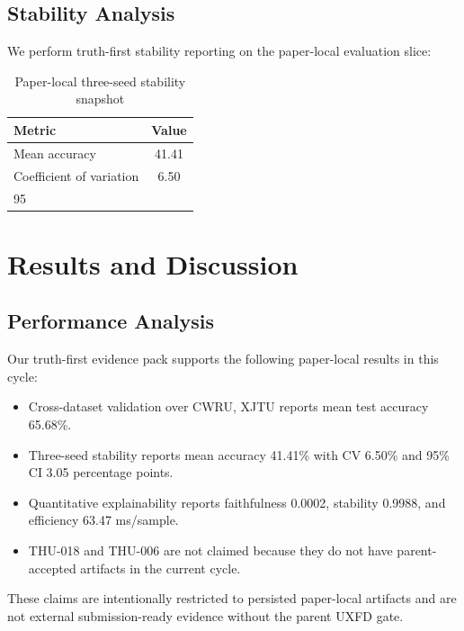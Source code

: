 \documentclass[journal]{IEEEtran}
\begin{document}
\subsection{Stability Analysis}

We perform truth-first stability reporting on the paper-local evaluation slice:

\begin{table}[t]
\centering
\caption{Paper-local three-seed stability snapshot}
\label{tab:stability}
\begin{tabular}{lc}
\toprule
Metric & Value \\
\midrule
Mean accuracy & 41.41\\%
Coefficient of variation & 6.50\\%
95\\%
\bottomrule
\end{tabular}
\end{table}

\section{Results and Discussion}

\subsection{Performance Analysis}

Our truth-first evidence pack supports the following paper-local results in this cycle:

\begin{itemize}
\item Cross-dataset validation over CWRU, XJTU reports mean test accuracy 65.68\%.
\item Three-seed stability reports mean accuracy 41.41\% with CV 6.50\% and 95\% CI 3.05 percentage points.
\item Quantitative explainability reports faithfulness 0.0002, stability 0.9988, and efficiency 63.47 ms/sample.
\item THU-018 and THU-006 are not claimed because they do not have parent-accepted artifacts in the current cycle.
\end{itemize}

These claims are intentionally restricted to persisted paper-local artifacts and are not external submission-ready evidence without the parent UXFD gate.
\end{document}
